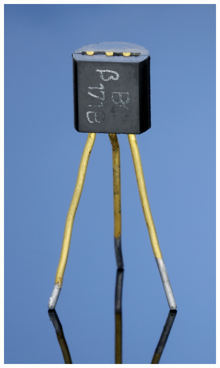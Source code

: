 \documentclass[11pt,a4paper,spanish]{beamer}
\begin{document}
\begin{frame}
\begin{minipage}{0.3\textwidth}
    \begin{figure}
        \includegraphics[width=1.0\textwidth]{img/transistor.jpg}
        \captionsetup{textfont=tiny,labelformat=empty}
        \caption{}
    \end{figure}

\end{minipage}

\end{frame}
\end{document}
